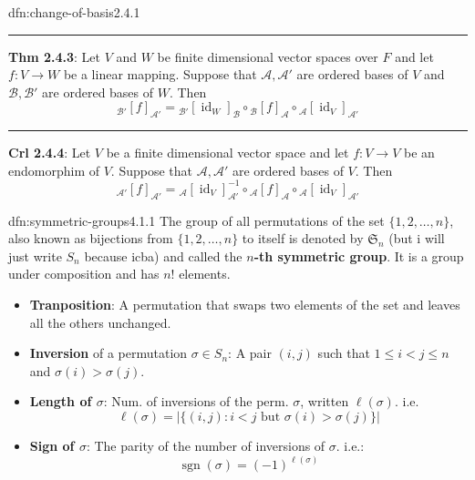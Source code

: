 \documentclass[landscape, 8pt]{extarticle}
\DeclareMathOperator{\sgn}{sgn}
\DeclareMathOperator{\id}{id}
\begin{document}
\begin{multicols}{3}
\begin{dfn}{dfn:change-of-basis}{2.4.1}
    \vspace{-3pt}
    \noindent\rule{\textwidth}{0.2pt}
    \textbf{Thm 2.4.3}: Let $V$ and $W$ be finite dimensional vector spaces over $F$ and let $f : V \to W$ be a linear mapping. Suppose that $\mathcal{A}, \mathcal{A}'$ are ordered bases of $V$ and $\mathcal{B}, \mathcal{B}'$ are ordered bases of $W$. Then
    \[{}_{\mathcal{B}'}[f]_{\mathcal{A}'} = {}_{\mathcal{B}'}[\id_{W}]_{\mathcal{B}} \circ {}_{\mathcal{B}}[f]_{\mathcal{A}} \circ {}_{\mathcal{A}}[\id_{V}]_{\mathcal{A}'}\]

    \vspace{-5pt}
    \noindent\rule{\textwidth}{0.2pt}
    \textbf{Crl 2.4.4}: Let $V$ be a finite dimensional vector space and let $f : V \to V$ be an endomorphim of $V$. Suppose that $\mathcal{A}, \mathcal{A}'$ are ordered bases of $V$. Then
    \[{}_{\mathcal{A}'}[f]_{\mathcal{A}'} = {}_{\mathcal{A}}[\id_{V}]_{\mathcal{A}'}^{-1} \circ {}_{\mathcal{A}}[f]_{\mathcal{A}} \circ {}_{\mathcal{A}}[\id_{V}]_{\mathcal{A}'}\]
\end{dfn}


\begin{dfn}{dfn:symmetric-groups}{4.1.1}
    The group of all permutations of the set $\{1,2,\dots,n\}$, also known as bijections from $\{1,2,\dots,n\}$ to itself is denoted by $\mathfrak{S}_{n}$ (but i will just write $S_{n}$ because icba) and called the \textbf{$n$-th symmetric group}. It is a group under composition and has $n!$ elements.


    \begin{itemize}[leftmargin=*]
        \setlength\itemsep{0em}
        \item \textbf{Tranposition}: A permutation that swaps two elements of the set and leaves all the others unchanged.
        \item \textbf{Inversion} of a permutation $\sigma\in S_{n}$: A pair $(i, j)$ such that $1 \le i < j \le n$ and $\sigma(i) > \sigma(j)$.         \item \textbf{Length of $\sigma$}: Num. of inversions of the perm. $\sigma$, written $\ell(\sigma)$. i.e.
        \[\ell(\sigma) = \lvert \{(i,j) : i < j \text{ but } \sigma(i) > \sigma(j)\} \rvert\]

        \item \textbf{Sign of $\sigma$}: The parity of the number of inversions of $\sigma$. i.e.:
            \[\sgn(\sigma) = (-1)^{\ell(\sigma)}\]
    \end{itemize}
\end{dfn}


\end{multicols}
\end{document}
